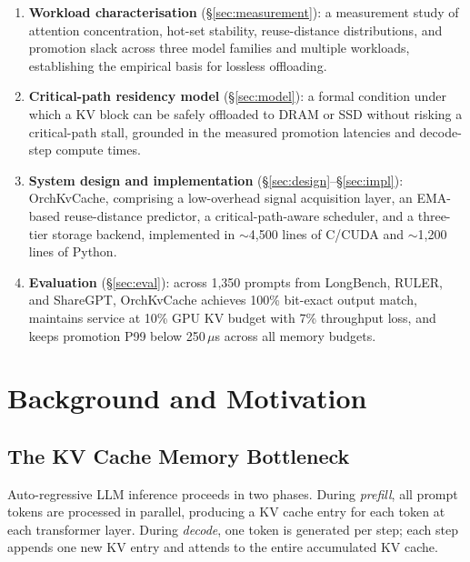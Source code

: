 \documentclass[acmsmall,nonacm,screen]{acmart}
\newcommand{\sys}{OrchKvCache}
\begin{document}
\begin{enumerate}
  \item \textbf{Workload characterisation} (\S\ref{sec:measurement}):
    a measurement study of attention concentration, hot-set stability,
    reuse-distance distributions, and promotion slack across three model
    families and multiple workloads, establishing the empirical basis for
    lossless offloading.

  \item \textbf{Critical-path residency model} (\S\ref{sec:model}):
    a formal condition under which a KV block can be safely offloaded to
    DRAM or SSD without risking a critical-path stall, grounded in the
    measured promotion latencies and decode-step compute times.

  \item \textbf{System design and implementation} (\S\ref{sec:design}--\S\ref{sec:impl}):
    \sys{}, comprising a low-overhead signal acquisition layer, an
    EMA-based reuse-distance predictor, a critical-path-aware scheduler,
    and a three-tier storage backend, implemented in ${\sim}$4{,}500 lines
    of C/CUDA and ${\sim}$1{,}200 lines of Python.

  \item \textbf{Evaluation} (\S\ref{sec:eval}):
    across 1{,}350 prompts from LongBench, RULER, and ShareGPT, \sys{}
    achieves 100\% bit-exact output match, maintains service at 10\% GPU
    KV budget with 7\% throughput loss, and keeps promotion P99 below
    250\,$\mu$s across all memory budgets.
\end{enumerate}


\section{Background and Motivation}\label{sec:background}

\subsection{The KV Cache Memory Bottleneck}\label{sec:bg:bottleneck}

Auto-regressive LLM inference proceeds in two phases.  During
\emph{prefill}, all prompt tokens are processed in parallel, producing a KV
cache entry for each token at each transformer layer.  During \emph{decode},
one token is generated per step; each step appends one new KV entry and
attends to the entire accumulated KV cache.
\end{document}
